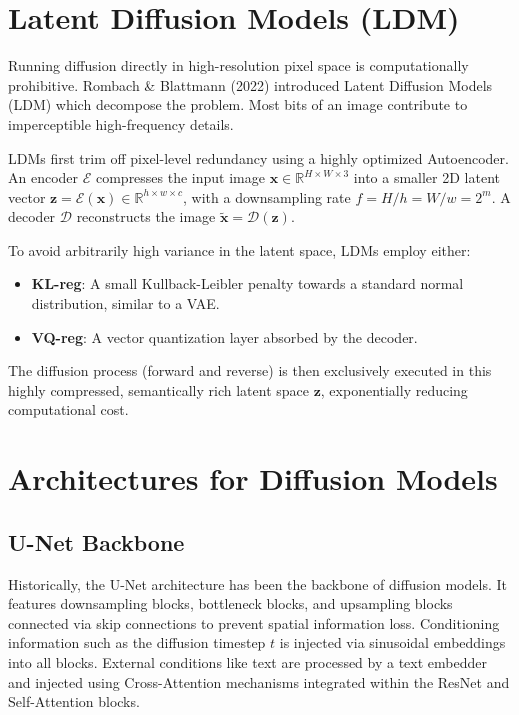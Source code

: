 \section{Latent Diffusion Models (LDM)}

Running diffusion directly in high-resolution pixel space is computationally prohibitive. Rombach \& Blattmann (2022) introduced Latent Diffusion Models (LDM) which decompose the problem. Most bits of an image contribute to imperceptible high-frequency details. 

LDMs first trim off pixel-level redundancy using a highly optimized Autoencoder. An encoder $\mathcal{E}$ compresses the input image $\mathbf{x} \in \mathbb{R}^{H \times W \times 3}$ into a smaller 2D latent vector $\mathbf{z} = \mathcal{E}(\mathbf{x}) \in \mathbb{R}^{h \times w \times c}$, with a downsampling rate $f = H/h = W/w = 2^m$. A decoder $\mathcal{D}$ reconstructs the image $\tilde{\mathbf{x}} = \mathcal{D}(\mathbf{z})$.

To avoid arbitrarily high variance in the latent space, LDMs employ either:
\begin{itemize}
    \item \textbf{KL-reg}: A small Kullback-Leibler penalty towards a standard normal distribution, similar to a VAE.
    \item \textbf{VQ-reg}: A vector quantization layer absorbed by the decoder.
\end{itemize}
The diffusion process (forward and reverse) is then exclusively executed in this highly compressed, semantically rich latent space $\mathbf{z}$, exponentially reducing computational cost.

\section{Architectures for Diffusion Models}

\subsection{U-Net Backbone}
Historically, the U-Net architecture has been the backbone of diffusion models. It features downsampling blocks, bottleneck blocks, and upsampling blocks connected via skip connections to prevent spatial information loss. 
Conditioning information such as the diffusion timestep $t$ is injected via sinusoidal embeddings into all blocks. External conditions like text are processed by a text embedder and injected using Cross-Attention mechanisms integrated within the ResNet and Self-Attention blocks.

